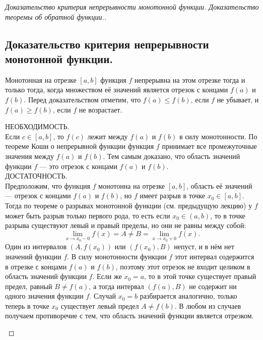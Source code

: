 
\label{sec_Proofs03}
\begin{proof}[Доказательство критерия непрерывности монотонной функции. Доказательство теоремы об обратной функции.]
    \subsection*{Доказательство критерия непрерывности монотонной функции.}
    \begin{note}[amber]
        Монотонная на отрезке $[a,b]$ функция $f$ непрерывна на этом отрезке тогда и только тогда, когда множеством её значений является отрезок с концами $f(a)$ и $f(b)$.
        Перед доказательством отметим, что $f(a) \le f(b)$, если $f$ не убывает, и $f(a) \ge f(b)$, если $f$ не возрастает. \\
        \begin{note}[purple]
            НЕОБХОДИМОСТЬ. \\
            Если $c \in [a,b]$, то $f(c)$ лежит между $f(a)$ и $f(b)$ в силу монотонности.
            По теореме Коши о непрерывной функции функция $f$ принимает все промежуточные значения между $f(a)$ и $f(b)$.
            Тем самым доказано, что область значений функции $f$ — это отрезок с концами $f(a)$ и $f(b)$.\\
            ДОСТАТОЧНОСТЬ. \\
            Предположим, что функция $f$ монотонна на отрезке $[a,b]$, область её значений — отрезок с концами $f(a)$ и $f(b)$, но $f$ имеет разрыв в точке $x_0 \in [a,b]$.
            Тогда по теореме о разрывах монотонной функции (см. предыдущую лекцию) у $f$ может быть разрыв только первого рода, то есть если $x_0 \in (a,b)$, то в точке разрыва существуют левый и правый пределы, но они не равны между собой:
            \[
            \lim_{x \to x_0 - 0} f(x) = A \ne B = \lim_{x \to x_0 + 0} f(x).
            \]
            Один из интервалов $(A, f(x_0))$ или $(f(x_0), B)$ непуст, и в нём нет значений функции $f$.
            В силу монотонности функции $f$ этот интервал содержится в отрезке с концами $f(a)$ и $f(b)$, поэтому этот отрезок не входит целиком в область значений функции $f$.
            Если же $x_0 = a$, то в этой точке существует правый предел, равный $B \ne f(a)$, а тогда интервал $(f(a), B)$ не содержит ни одного значения функции $f$.
            Случай $x_0 = b$ разбирается аналогично, только теперь в точке $x_0$ существует левый предел $A \ne f(b)$.
            В любом из случаев получаем противоречие с тем, что область значений функции является отрезком.
        \end{note}
    \end{note}


\end{proof}
